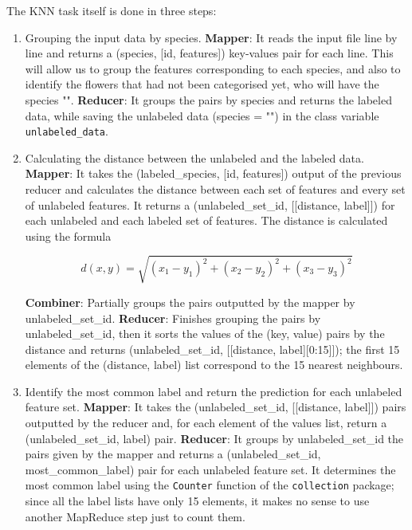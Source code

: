 \documentclass[12pt, a4paper]{article}
\begin{document}
The KNN task itself is done in three steps:
\begin{enumerate}[label=\textbf{Step \arabic*.}, wide=0pt, leftmargin=2em]
\item Grouping the input data by species.
	\subitem \textbf{Mapper}: It reads the input file line by line and returns a (species, [id, features]) key-values pair for each line. This will allow us to group the features corresponding to each species, and also to identify the flowers that had not been categorised yet, who will have the species "".
	\subitem \textbf{Reducer}: It groups the pairs by species and returns the labeled data, while saving the unlabeled data (species = "") in the class variable \texttt{unlabeled\_data}.
\item Calculating the distance between the unlabeled and the labeled data.
	\subitem \textbf{Mapper}: It takes the (labeled\_species, [id, features]) output of the previous reducer and calculates the distance between each set of features and every set of unlabeled features. It returns a (unlabeled\_set\_id, [[distance, label]]) for each unlabeled and each labeled set of features. The distance is calculated using the formula

\begin{equation}
	d(x, y) = \sqrt{(x_1 - y_1)^2 + (x_2 - y_2)^2 + (x_3 - y_3)^2}
\end{equation}

	\subitem \textbf{Combiner}: Partially groups the pairs outputted by the mapper by unlabeled\_set\_id.
	\subitem \textbf{Reducer}: Finishes grouping the pairs by unlabeled\_set\_id, then it sorts the values of the (key, value) pairs by the distance and returns (unlabeled\_set\_id,  [[distance, label][0:15]]); the first 15 elements of the (distance, label) list correspond to the 15 nearest neighbours.
\item Identify the most common label and return the prediction for each unlabeled feature set.
	\subitem \textbf{Mapper}: It takes the (unlabeled\_set\_id, [[distance, label]]) pairs outputted by the reducer and, for each element of the values list, return a (unlabeled\_set\_id, label) pair.
	\subitem \textbf{Reducer}: It groups by unlabeled\_set\_id the pairs given by the mapper and returns a (unlabeled\_set\_id, most\_common\_label) pair for each unlabeled feature set. It determines the most common label using the \texttt{Counter} function of the \texttt{collection} package; since all the label lists have only 15 elements, it makes no sense to use another MapReduce step just to count them.
\end{enumerate}
\end{document}
